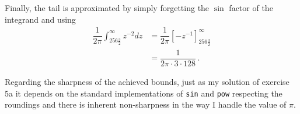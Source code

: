 \documentclass[a4paper, 11 pt]{amsart}
\theoremstyle{definition}
\theoremstyle{remark}
\numberwithin{equation}{section}
\begin{document}
Finally, the tail is approximated by simply forgetting the $ \sin $ factor of 
the integrand and using
\begin{align*}
	\dfrac{1}{2\pi}\int_{256\frac{3}{2}}^{\infty}z^{-2}dz & = 
	\dfrac{1}{2\pi}\left[ -z^{-1} \right]_{256\frac{3}{2}}^{\infty} \\
	& = \dfrac{1}{2\pi\cdot 3\cdot 128} \, .
\end{align*}

Regarding the sharpness of the achieved bounds, just as my solution of exercise 
5a it depends on the standard implementations of \texttt{sin} and 
\texttt{pow} respecting the roundings and there is inherent non-sharpness in 
the way I handle the value of $ \pi $.

\appendix


%	
\end{document}
